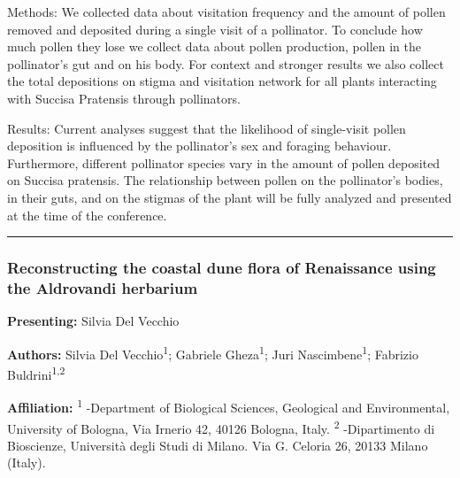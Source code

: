 \documentclass[
  letterpaper,
  DIV=11,
  numbers=noendperiod]{scrartcl}
\begin{document}
Methods: We collected data about visitation frequency and the amount of
pollen removed and deposited during a single visit of a pollinator. To
conclude how much pollen they lose we collect data about pollen
production, pollen in the pollinator's gut and on his body. For context
and stronger results we also collect the total depositions on stigma and
visitation network for all plants interacting with Succisa Pratensis
through pollinators.

Results: Current analyses suggest that the likelihood of single-visit
pollen deposition is influenced by the pollinator's sex and foraging
behaviour. Furthermore, different pollinator species vary in the amount
of pollen deposited on Succisa pratensis. The relationship between
pollen on the pollinator's bodies, in their guts, and on the stigmas of
the plant will be fully analyzed and presented at the time of the
conference.

\begin{center}\rule{0.5\linewidth}{0.5pt}\end{center}

\subsubsection{Reconstructing the coastal dune flora of Renaissance
using the Aldrovandi
herbarium}\label{reconstructing-the-coastal-dune-flora-of-renaissance-using-the-aldrovandi-herbarium}

\textbf{Presenting:} Silvia Del Vecchio

\textbf{Authors:} Silvia Del Vecchio\textsuperscript{1}; Gabriele
Gheza\textsuperscript{1}; Juri Nascimbene\textsuperscript{1}; Fabrizio
Buldrini\textsuperscript{1,2}

\textbf{Affiliation:} \textsuperscript{1} -Department of Biological
Sciences, Geological and Environmental, University of Bologna, Via
Irnerio 42, 40126 Bologna, Italy. \textsuperscript{2} -Dipartimento di
Bioscienze, Università degli Studi di Milano. Via G. Celoria 26, 20133
Milano (Italy).
\end{document}
